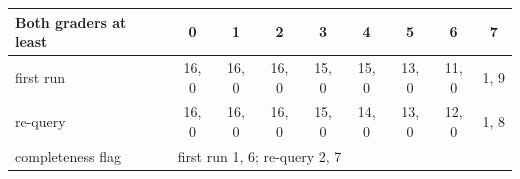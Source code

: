 \begingroup\scriptsize\setlength{\tabcolsep}{4pt}
\begin{tabular}{@{}lcccccccc@{}}
\toprule
Both graders at least & 0 & 1 & 2 & 3 & 4 & 5 & 6 & 7 \\
\midrule
first run & 16, 0 & 16, 0 & 16, 0 & 15, 0 & 15, 0 & 13, 0 & 11, 0 & 1, 9 \\
re-query & 16, 0 & 16, 0 & 16, 0 & 15, 0 & 14, 0 & 13, 0 & 12, 0 & 1, 8 \\
completeness flag & \multicolumn{8}{l}{first run 1, 6; re-query 2, 7} \\
\bottomrule
\end{tabular}
\endgroup
